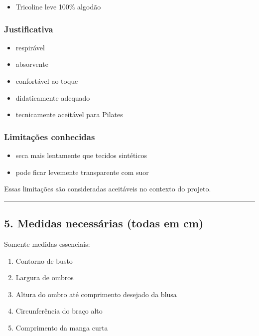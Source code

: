 \documentclass[
  10pt,oneside]{article}
\providecommand{\tightlist}{%
  \setlength{\itemsep}{0pt}\setlength{\parskip}{0pt}}
\begin{document}
\begin{itemize}
\tightlist
\item
  Tricoline leve 100\% algodão
\end{itemize}

\subsubsection{Justificativa}\label{justificativa}

\begin{itemize}
\tightlist
\item
  respirável
\item
  absorvente
\item
  confortável ao toque
\item
  didaticamente adequado
\item
  tecnicamente aceitável para Pilates
\end{itemize}

\subsubsection{Limitações conhecidas}\label{limitauxe7uxf5es-conhecidas}

\begin{itemize}
\tightlist
\item
  seca mais lentamente que tecidos sintéticos
\item
  pode ficar levemente transparente com suor
\end{itemize}

Essas limitações são consideradas aceitáveis no contexto do projeto.

\begin{center}\rule{0.5\linewidth}{0.5pt}\end{center}

\subsection{5. Medidas necessárias (todas em cm)}\label{medidas-necessuxe1rias-todas-em-cm}

Somente medidas essenciais:

\begin{enumerate}
\def\labelenumi{\arabic{enumi}.}
\tightlist
\item
  Contorno de busto
\item
  Largura de ombros
\item
  Altura do ombro até comprimento desejado da blusa
\item
  Circunferência do braço alto
\item
  Comprimento da manga curta
\end{enumerate}
\end{document}
